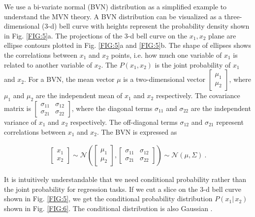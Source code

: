 \documentclass[preprint,12pt]{elsarticle}
\begin{document}
We use a bi-variate normal (BVN) distribution as a simplified example to understand the MVN theory. A BVN distribution can be visualized as a three-dimensional (3-d) bell curve with heights represent the probability density shown in Fig. \ref{FIG:5}a. The projections of the 3-d bell curve on the $x_1, x_2$ plane are ellipse contours plotted in Fig. \ref{FIG:5}a and \ref{FIG:5}b. The shape of ellipses shows the correlations between $x_1$ and $x_2$ points, i.e. how much one variable of $x_1$ is related to another variable of $x_2$. The $P(x_1, x_2)$ is the joint probability of $x_1$ and $x_2$. For a BVN, the mean vector $\mu$ is a two-dimensional vector $\begin{bmatrix} \mu_1 \\ \mu_2 \end{bmatrix}$, where $\mu_1$ and $\mu_2$ are the independent mean of $x_1$ and $x_2$ respectively. The covariance matrix is $\begin{bmatrix} \sigma_{11} & \sigma_{12} \\ \sigma_{21} & \sigma_{22} \end{bmatrix}$, where the diagonal terms $\sigma_{11}$ and $\sigma_{22}$ are the independent variance of $x_1$ and $x_2$ respectively. The off-diagonal terms $\sigma_{12}$ and $\sigma_{21}$ represent correlations between $x_1$ and $x_2$. The BVN is expressed as 
\begin{ceqn}
    \begin{align}
       \begin{bmatrix} x_1 \\ x_2 \end{bmatrix} \sim \mathcal{N}\left(\begin{bmatrix} \mu_1 \\ \mu_2 \end{bmatrix}, \begin{bmatrix} \sigma_{11} & \sigma_{12}  \\ \sigma_{21} & \sigma_{22} \end{bmatrix}\right) \sim \mathcal{N}(\mu, \Sigma) \ . \nonumber
    \end{align}
\end{ceqn}

It is intuitively understandable that we need conditional probability rather than the joint probability for regression tasks. If we cut a slice on the 3-d bell curve shown in Fig. \ref{FIG:5}, we get the conditional probability distribution $P(x_1 \vert \, x_2)$ shown in Fig. \ref{FIG:6}. The conditional distribution is also Gaussian \cite{Rasmussen2006}.
\end{document}
